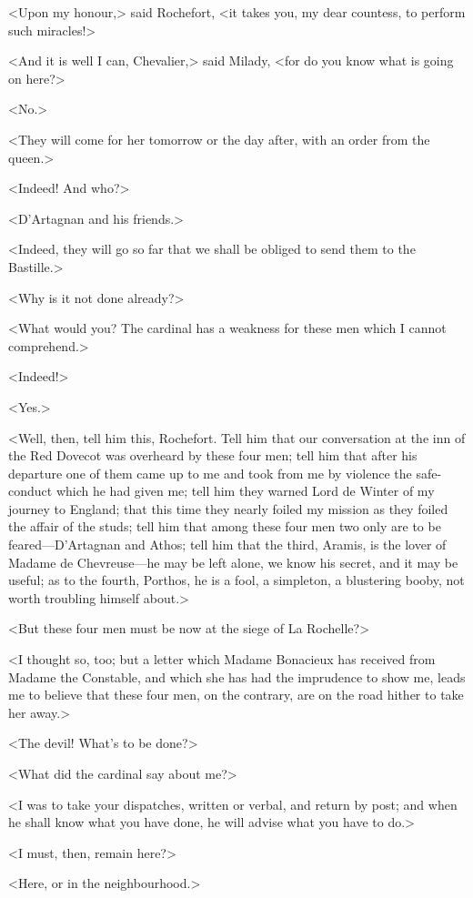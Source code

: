 <Upon my honour,> said Rochefort, <it takes you, my dear countess, to perform such miracles!> 

<And it is well I can, Chevalier,> said Milady, <for do you know what is going on here?> 

<No.> 

<They will come for her tomorrow or the day after, with an order from the queen.> 

<Indeed! And who?> 

<D'Artagnan and his friends.> 

<Indeed, they will go so far that we shall be obliged to send them to the Bastille.> 

<Why is it not done already?> 

<What would you? The cardinal has a weakness for these men which I cannot comprehend.> 

<Indeed!> 

<Yes.> 

<Well, then, tell him this, Rochefort. Tell him that our conversation at the inn of the Red Dovecot was overheard by these four men; tell him that after his departure one of them came up to me and took from me by violence the safe-conduct which he had given me; tell him they warned Lord de Winter of my journey to England; that this time they nearly foiled my mission as they foiled the affair of the studs; tell him that among these four men two only are to be feared—D'Artagnan and Athos; tell him that the third, Aramis, is the lover of Madame de Chevreuse—he may be left alone, we know his secret, and it may be useful; as to the fourth, Porthos, he is a fool, a simpleton, a blustering booby, not worth troubling himself about.> 

<But these four men must be now at the siege of La Rochelle?> 

<I thought so, too; but a letter which Madame Bonacieux has received from Madame the Constable, and which she has had the imprudence to show me, leads me to believe that these four men, on the contrary, are on the road hither to take her away.> 

<The devil! What's to be done?> 

<What did the cardinal say about me?> 

<I was to take your dispatches, written or verbal, and return by post; and when he shall know what you have done, he will advise what you have to do.> 

<I must, then, remain here?> 

<Here, or in the neighbourhood.> 

